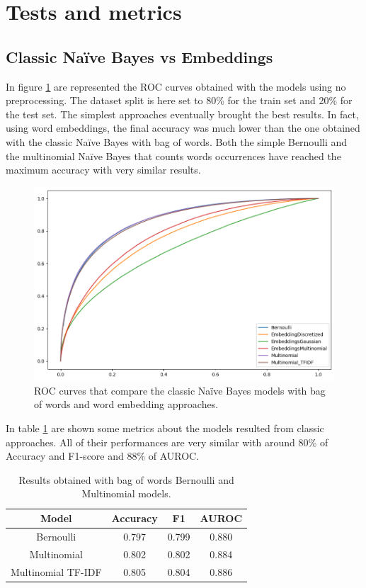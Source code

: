 \section*{Tests and metrics}

\subsection*{Classic Na\"ive Bayes vs Embeddings}

In figure \ref{fig:classic_nb_vs_embeddings} are represented the ROC curves obtained with the models 
using no preprocessing. The dataset split is here set to 80\% for the train set and 20\% for the test set.
The simplest approaches eventually brought the best results. In fact, using word embeddings, the final
accuracy was much lower than the one obtained with the classic Na\"ive Bayes with bag of words. 
Both the simple Bernoulli and the multinomial Na\"ive Bayes that counts words occurrences 
have reached the maximum accuracy with very similar results.

\begin{figure}[h!t]
    \centering
    \includegraphics[scale=0.50]{../experiments/plots/classic_nb_vs_embeddings}
    \caption{ROC curves that compare the classic Na\"ive Bayes models with bag of words and
    word embedding approaches.}
    \label{fig:classic_nb_vs_embeddings}        
\end{figure}

In table \ref{tab:classic_nb_vs_embeddings} are shown some metrics about the models resulted from 
classic approaches. All of their performances are very similar with around 80\% of Accuracy and 
F1-score and 88\% of AUROC. 

\begin{table}[h!t]
    \centering
    \caption{Results obtained with bag of words Bernoulli and Multinomial models.}
    \label{tab:classic_nb_vs_embeddings}
    \begin{tabular}{c|ccc}
        \hline
        Model & Accuracy & F1 & AUROC \\
        \hline 
        Bernoulli & 0.797 & 0.799 & 0.880 \\ 
        Multinomial & 0.802 & 0.802 & 0.884 \\ 
        Multinomial TF-IDF & 0.805 & 0.804 & 0.886 \\ 
        \hline
    \end{tabular}
\end{table}

